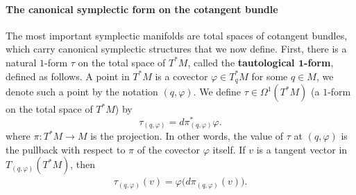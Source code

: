 \paragraph{The canonical symplectic form on the cotangent bundle}
The most important symplectic manifolds are total spaces of cotangent bundles, which carry canonical symplectic structures that we now define. First, there is a natural $1$-form $\tau$ on the total space of $T^*M$, called the \textbf{tautological $\bm{1}$-form}, defined as follows. A point in $T^*M$ is a covector $\varphi\in T_q^*M$ for some $q\in M$, we denote such a point by the notation $(q,\varphi)$. We define $\tau\in\Omega^1(T^*M)$ (a $1$-form on the total space of $T^*M$) by
\[\tau_{(q,\varphi)}=d\pi^*_{(q,\varphi)}\varphi.\]
where $\pi:T^*M\to M$ is the projection. In other words, the value of $\tau$ at $(q,\varphi)$ is the pullback with respect to $\pi$ of the covector $\varphi$ itself. If $v$ is a tangent vector in $T_{(q,\varphi)}(T^*M)$, then
\begin{align}\label{tautological form def}
\tau_{(q,\varphi)}(v)=\varphi\big(d\pi_{(q,\varphi)}(v)\big).
\end{align}

